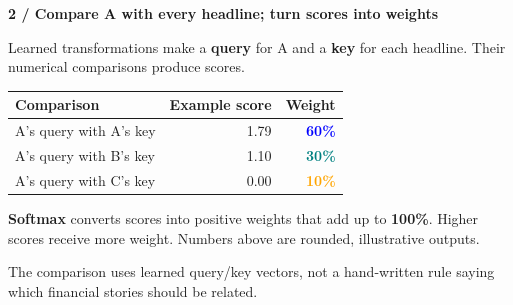 \documentclass[11pt,a4paper,landscape]{article}
\newcommand{\sub}[1]{{\large\bfseries\color{navy}#1}\par}
\begin{document}
\begin{minipage}[t]{.46\linewidth}
\sub{2 / Compare A with every headline; turn scores into weights}
Learned transformations make a \textbf{query} for A and a \textbf{key} for each headline. Their numerical comparisons produce scores.

\begin{tabularx}{\linewidth}{@{}Yrr@{}}
\toprule
\textbf{Comparison} & \textbf{Example score} & \textbf{Weight}\\\midrule
A's query with A's key & 1.79 & \textcolor{blue}{\textbf{60\%}}\\
A's query with B's key & 1.10 & \textcolor{teal}{\textbf{30\%}}\\
A's query with C's key & 0.00 & \textcolor{orange}{\textbf{10\%}}\\\bottomrule
\end{tabularx}

\textbf{Softmax} converts scores into positive weights that add up to \textbf{100\%}. Higher scores receive more weight. Numbers above are rounded, illustrative outputs.

\begin{center}
\end{center}
{\small\color{slate}The comparison uses learned query/key vectors, not a hand-written rule saying which financial stories should be related.}
\end{minipage}\hfill
\end{document}
